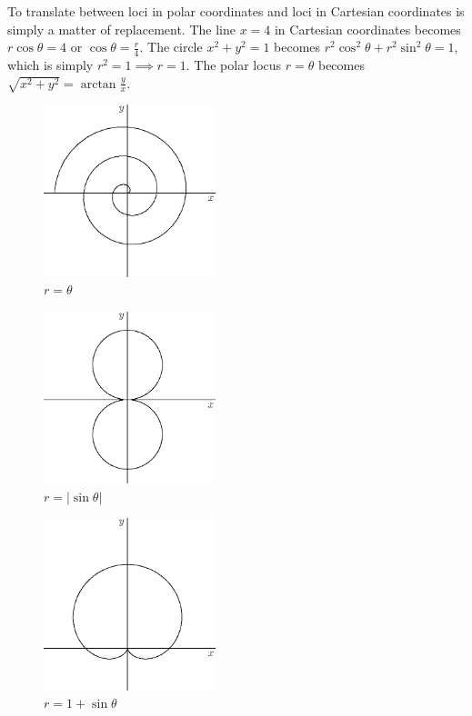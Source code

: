 \documentclass[fleqn,letterpaper]{report}
\begin{document}
To translate between loci in polar coordinates and loci in
Cartesian coordinates is simply a matter of replacement. The
line $x=4$ in Cartesian coordinates becomes $r\cos \theta = 4$
or $\cos \theta = \frac{r}{4}$. The circle $x^2 + y^2 =1 $
becomes $r^2 \cos^2 \theta + r^2 \sin^2 \theta = 1$, which is
simply $r^2 = 1 \implies r=1$. The polar locus $r=\theta$
becomes $\sqrt{x^2 + y^2} = \arctan \frac{y}{x}$.

\begin{figure}[t]
\centering
\includegraphics[width=5cm]{figure27.eps}
\caption{$r = \theta$}
\label{figure-polar-locus1}
\end{figure}

\begin{figure}[t]
\centering
\includegraphics[width=5cm]{figure28.eps}
\caption{$r = |\sin \theta|$}
\label{figure-polar-locus2}
\end{figure}

\begin{figure}[t]
\centering
\includegraphics[width=5cm]{figure29.eps}
\caption{$r = 1 + \sin \theta$}
\label{figure-polar-locus3}
\end{figure}
\end{document}
